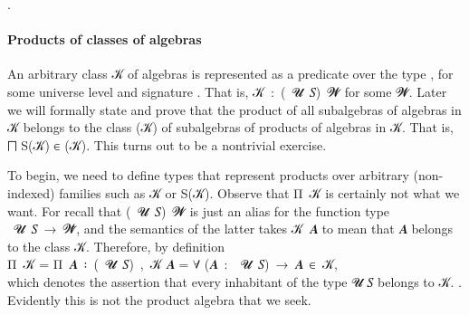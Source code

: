 \AgdaSpace{}%
\AgdaSymbol{:=}\AgdaSpace{}%
\AgdaSpace{}%
\AgdaSpace{}%
\AgdaSpace{}%
\AgdaSpace{}%
\AgdaSpace{}%
.


\paragraph*{Products of classes of algebras}\label{products-of-classes-of-algebras}

An arbitrary class \ab 𝒦 of algebras is represented as a predicate over the type \AgdaSpace{}\AgdaSpace{}, for some universe level  and signature .
That is, \ab 𝒦~\as :~(~\ab 𝓤~\ab 𝑆)~𝓦 for some 𝓦.
Later we will formally state and prove that the product of all subalgebras of algebras in \ab 𝒦  belongs to the class (\ab 𝒦) of subalgebras of products of algebras in \ab 𝒦. That is, \af ⨅ \af S(\ab 𝒦) \af ∈ (\ab 𝒦). This turns out to be a nontrivial exercise.

To begin, we need to define types that represent products over arbitrary (non-indexed) families such as \ab 𝒦 or \af S(\ab 𝒦). Observe that \ad Π~\ab 𝒦 is certainly not what we want.  For recall that (~\ab 𝓤~\ab 𝑆)~\ab 𝓦 is just an alias for the function type ~\ab 𝓤~\ab 𝑆~\as →~\ab 𝓦\af ̇, and the semantics of the latter takes \ab 𝒦~\ab 𝑨 to mean that \ab 𝑨 belongs to the class \ab 𝒦. Therefore, by definition\\[-10pt]

\ad Π~\ab 𝒦 \hskip1mm = \hskip1mm \ad Π~\ab 𝑨~\af ꞉~(~\ab 𝓤~\ab 𝑆)~,~\ab 𝒦 𝑨
             \hskip1mm = \hskip1mm \as ∀ (\ab 𝑨~\as :~~\ab 𝓤~\ab 𝑆)~\as →~\ab 𝑨~\af ∈~\ab 𝒦,\\[4pt]
which denotes the assertion that every inhabitant of the type  \ab 𝓤 \ab 𝑆 belongs to \ab 𝒦. .  Evidently this is not the product algebra that we seek.

